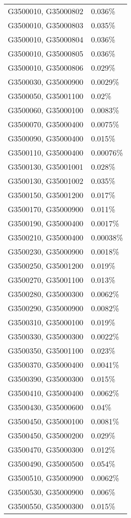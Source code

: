 \begin{longtable}[]{@{}ll@{}}
G3500010, G35000802 & 0.036\% \\
G3500010, G35000803 & 0.035\% \\
G3500010, G35000804 & 0.036\% \\
G3500010, G35000805 & 0.036\% \\
G3500010, G35000806 & 0.029\% \\
G3500030, G35000900 & 0.0029\% \\
G3500050, G35001100 & 0.02\% \\
G3500060, G35000100 & 0.0083\% \\
G3500070, G35000400 & 0.0075\% \\
G3500090, G35000400 & 0.015\% \\
G3500110, G35000400 & 0.00076\% \\
G3500130, G35001001 & 0.028\% \\
G3500130, G35001002 & 0.035\% \\
G3500150, G35001200 & 0.017\% \\
G3500170, G35000900 & 0.011\% \\
G3500190, G35000400 & 0.0017\% \\
G3500210, G35000400 & 0.00038\% \\
G3500230, G35000900 & 0.0018\% \\
G3500250, G35001200 & 0.019\% \\
G3500270, G35001100 & 0.013\% \\
G3500280, G35000300 & 0.0062\% \\
G3500290, G35000900 & 0.0082\% \\
G3500310, G35000100 & 0.019\% \\
G3500330, G35000300 & 0.0022\% \\
G3500350, G35001100 & 0.023\% \\
G3500370, G35000400 & 0.0041\% \\
G3500390, G35000300 & 0.015\% \\
G3500410, G35000400 & 0.0062\% \\
G3500430, G35000600 & 0.04\% \\
G3500450, G35000100 & 0.0081\% \\
G3500450, G35000200 & 0.029\% \\
G3500470, G35000300 & 0.012\% \\
G3500490, G35000500 & 0.054\% \\
G3500510, G35000900 & 0.0062\% \\
G3500530, G35000900 & 0.006\% \\
G3500550, G35000300 & 0.015\% \\

\end{longtable}
